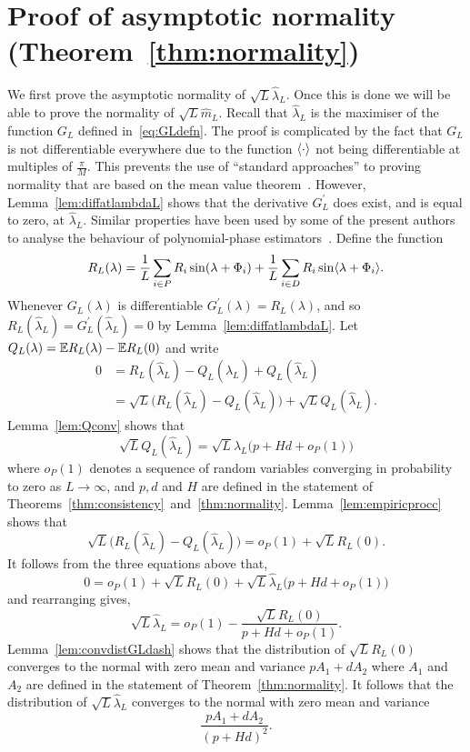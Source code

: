 \documentclass[journal]{IEEEtran}
\begin{document}
\section{Proof of asymptotic normality (Theorem~\ref{thm:normality}) } \label{sec:proof-asympt-norm}

We first prove the asymptotic normality of $\sqrt{L} \hat{\lambda}_L$.  Once this is done we will be able to prove the normality of $\sqrt{L} \hat{m}_L$.  Recall that $\hat{\lambda}_L$ is the maximiser of the function $G_L$ defined in~\eqref{eq:GLdefn}.  The proof is complicated by the fact that $G_L$ is not differentiable everywhere due to the function $\left\langle \cdot \right\rangle$ not being differentiable at multiples of $\tfrac{\pi}{M}$.  This prevents the use of ``standard approaches'' to proving normality that are based on the mean value theorem~\cite{vonMises_diff_stats_1947,vanDerVart1971_asymptotic_stats,Pollard_new_ways_clts_1986,Pollard_conv_stat_proc_1984,Pollard_asymp_empi_proc_1989,van2009empirical}.  However, Lemma~\ref{lem:diffatlambdaL} shows that the derivative $G_L^\prime$ does exist, and is equal to zero, at $\hat{\lambda}_L$.  Similar properties have been used by some of the present authors to analyse the behaviour of polynomial-phase estimators~\cite{McKilliam_LSU_polyest_part_arxiv_2012}.  %
Define the function
\begin{equation}\label{eq:RLdef}
R_L(\lambda) = \frac{1}{L} \sum_{i \in P} R_i \sin(\lambda + \Phi_i) + \frac{1}{L} \sum_{i \in D} R_i \sin\langle \lambda + \Phi_i \rangle.
\end{equation}
Whenever $G_L(\lambda)$ is differentiable $G_L^\prime(\lambda) = R_L(\lambda)$, and so $R_L(\hat{\lambda}_L) = G_L^\prime(\hat{\lambda}_L) = 0$ by Lemma~\ref{lem:diffatlambdaL}.  Let $Q_L(\lambda) = {\mathbb E} R_L(\lambda) - {\mathbb E} R_L(0)$ and write
\begin{align*}
0 &= R_L(\hat{\lambda}_L) - Q_L(\hat{\lambda}_L) + Q_L(\hat{\lambda}_L) \\
&= \sqrt{L}\big( R_L(\hat{\lambda}_L) - Q_L(\hat{\lambda}_L) \big) + \sqrt{L}Q_L(\hat{\lambda}_L).
\end{align*}
Lemma~\ref{lem:Qconv} shows that
\[
\sqrt{L} Q_L(\hat{\lambda}_L) = \sqrt{L} \hat{\lambda}_L\big( p + Hd  + o_P(1) \big)
\]
where $o_P(1)$ denotes a sequence of random variables converging in probability to zero as $L \rightarrow \infty$, and $p,d$ and $H$ are defined in the statement of Theorems~\ref{thm:consistency}~and~\ref{thm:normality}.  Lemma~\ref{lem:empiricprocc} shows that
\[
\sqrt{L}\big( R_L(\hat{\lambda}_L) - Q_L(\hat{\lambda}_L) \big) = o_P(1) + \sqrt{L} R_L(0).
\]
It follows from the three equations above that,
\[
0 = o_P(1) + \sqrt{L}R_L(0) + \sqrt{L} \hat{\lambda}_L \big( p + Hd  + o_P(1) \big)
\]
and rearranging gives,
\[
\sqrt{L} \hat{\lambda}_L = o_P(1) - \frac{\sqrt{L}R_L(0)}{p + Hd  + o_P(1)}.
\]
Lemma~\ref{lem:convdistGLdash} shows that the distribution of $\sqrt{L}R_L(0)$ converges to the normal with zero mean and variance $pA_1 + dA_2$ where $A_1$ and $A_2$ are defined in the statement of Theorem~\ref{thm:normality}.  It follows that the distribution of $\sqrt{L}\hat{\lambda}_L$ converges to the normal with zero mean and variance
\[
\frac{pA_1 + dA_2}{(p + Hd)^2}.
\]
 
\end{document}
